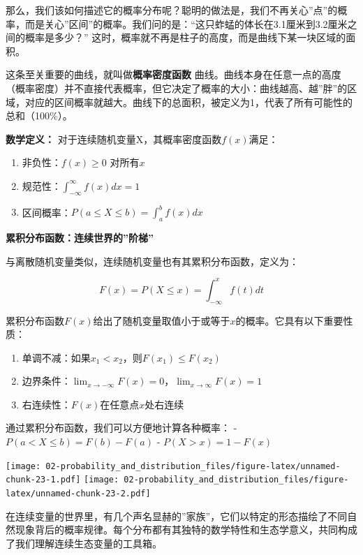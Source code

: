 \documentclass[
  twoside]{book}
\providecommand{\tightlist}{%
  \setlength{\itemsep}{0pt}\setlength{\parskip}{0pt}}
\begin{document}
那么，我们该如何描述它的概率分布呢？聪明的做法是，我们不再关心''点''的概率，而是关心''区间''的概率。我们问的是：``这只蚱蜢的体长在3.1厘米到3.2厘米之间的概率是多少？'' 这时，概率就不再是柱子的高度，而是曲线下某一块区域的面积。

这条至关重要的曲线，就叫做\textbf{概率密度函数} 曲线。曲线本身在任意一点的高度（概率密度）并不直接代表概率，但它决定了概率的大小：曲线越高、越''胖''的区域，对应的区间概率就越大。曲线下的总面积，被定义为1，代表了所有可能性的总和（100\%）。

\textbf{数学定义：} 对于连续随机变量X，其概率密度函数\(f(x)\)满足：

\begin{enumerate}
\def\labelenumi{\arabic{enumi}.}
\tightlist
\item
  非负性：\(f(x) \geq 0\) 对所有\(x\)
\item
  规范性：\(\int_{-\infty}^{\infty} f(x) dx = 1\)
\item
  区间概率：\(P(a \leq X \leq b) = \int_a^b f(x) dx\)
\end{enumerate}

\textbf{累积分布函数：连续世界的''阶梯''}

与离散随机变量类似，连续随机变量也有其累积分布函数，定义为：

\[F(x) = P(X \leq x) = \int_{-\infty}^x f(t) dt\]

累积分布函数\(F(x)\)给出了随机变量取值小于或等于\(x\)的概率。它具有以下重要性质：

\begin{enumerate}
\def\labelenumi{\arabic{enumi}.}
\tightlist
\item
  单调不减：如果\(x_1 < x_2\)，则\(F(x_1) \leq F(x_2)\)
\item
  边界条件：\(\lim_{x \to -\infty} F(x) = 0\)，\(\lim_{x \to \infty} F(x) = 1\)
\item
  右连续性：\(F(x)\)在任意点\(x\)处右连续
\end{enumerate}

通过累积分布函数，我们可以方便地计算各种概率：
- \(P(a < X \leq b) = F(b) - F(a)\)
- \(P(X > x) = 1 - F(x)\)

\texttt{[image: 02-probability\_and\_distribution\_files/figure-latex/unnamed-chunk-23-1.pdf]} \texttt{[image: 02-probability\_and\_distribution\_files/figure-latex/unnamed-chunk-23-2.pdf]}

在连续变量的世界里，有几个声名显赫的''家族''，它们以特定的形态描绘了不同自然现象背后的概率规律。每个分布都有其独特的数学特性和生态学意义，共同构成了我们理解连续生态变量的工具箱。
\end{document}

